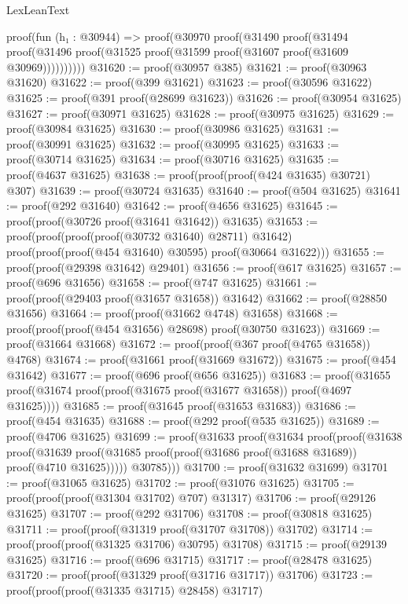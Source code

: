 \begin{lexlean}{LexLeanText}
\begin{coremodule}
      proof(fun (h₁ : @30944) =>
        proof(@30970
            proof(@31490
                proof(@31494
                    proof(@31496
                        proof(@31525 proof(@31599 proof(@31607 proof(@31609 @30969))))))))))
@31620 := proof(@30957 @385)
@31621 := proof(@30963 @31620)
@31622 := proof(@399 @31621)
@31623 := proof(@30596 @31622)
@31625 := proof(@391 proof(@28699 @31623))
@31626 := proof(@30954 @31625)
@31627 := proof(@30971 @31625)
@31628 := proof(@30975 @31625)
@31629 := proof(@30984 @31625)
@31630 := proof(@30986 @31625)
@31631 := proof(@30991 @31625)
@31632 := proof(@30995 @31625)
@31633 := proof(@30714 @31625)
@31634 := proof(@30716 @31625)
@31635 := proof(@4637 @31625)
@31638 := proof(proof(proof(@424 @31635) @30721) @307)
@31639 := proof(@30724 @31635)
@31640 := proof(@504 @31625)
@31641 := proof(@292 @31640)
@31642 := proof(@4656 @31625)
@31645 := proof(proof(@30726 proof(@31641 @31642)) @31635)
@31653 := proof(proof(proof(proof(@30732 @31640) @28711) @31642)
      proof(proof(proof(@454 @31640) @30595) proof(@30664 @31622)))
@31655 := proof(proof(@29398 @31642) @29401)
@31656 := proof(@617 @31625)
@31657 := proof(@696 @31656)
@31658 := proof(@747 @31625)
@31661 := proof(proof(@29403 proof(@31657 @31658)) @31642)
@31662 := proof(@28850 @31656)
@31664 := proof(proof(@31662 @4748) @31658)
@31668 := proof(proof(proof(@454 @31656) @28698) proof(@30750 @31623))
@31669 := proof(@31664 @31668)
@31672 := proof(proof(@367 proof(@4765 @31658)) @4768)
@31674 := proof(@31661 proof(@31669 @31672))
@31675 := proof(@454 @31642)
@31677 := proof(@696 proof(@656 @31625))
@31683 := proof(@31655 proof(@31674 proof(proof(@31675 proof(@31677 @31658)) proof(@4697 @31625))))
@31685 := proof(@31645 proof(@31653 @31683))
@31686 := proof(@454 @31635)
@31688 := proof(@292 proof(@535 @31625))
@31689 := proof(@4706 @31625)
@31699 := proof(@31633
      proof(@31634
          proof(proof(@31638
                proof(@31639
                    proof(@31685 proof(proof(@31686 proof(@31688 @31689)) proof(@4710 @31625)))))
              @30785)))
@31700 := proof(@31632 @31699)
@31701 := proof(@31065 @31625)
@31702 := proof(@31076 @31625)
@31705 := proof(proof(proof(@31304 @31702) @707) @31317)
@31706 := proof(@29126 @31625)
@31707 := proof(@292 @31706)
@31708 := proof(@30818 @31625)
@31711 := proof(proof(@31319 proof(@31707 @31708)) @31702)
@31714 := proof(proof(proof(@31325 @31706) @30795) @31708)
@31715 := proof(@29139 @31625)
@31716 := proof(@696 @31715)
@31717 := proof(@28478 @31625)
@31720 := proof(proof(@31329 proof(@31716 @31717)) @31706)
@31723 := proof(proof(proof(@31335 @31715) @28458) @31717)

\end{coremodule}
\end{lexlean}
